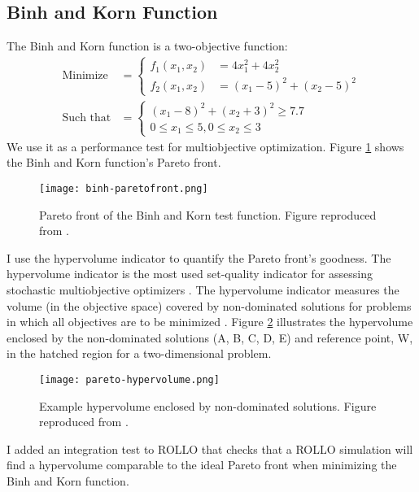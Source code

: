\subsection{Binh and Korn Function}
\label{sec:binhandkorn}
The Binh and Korn function \cite{binh_mobes_1997} is a two-objective function:
\begin{align}
    \mbox{Minimize} &= \begin{cases}
        f_1 (x_1,x_2) &= 4x_1^2+4x_2^2 \\
        f_2 (x_1,x_2) &= (x_1-5)^2 + (x_2-5)^2 
    \end{cases} \\
    \mbox{Such that} &= \begin{cases}
        (x_1-8)^2 + (x_2+3)^2 \geq 7.7 \nonumber \\
        0 \leq x_1 \leq 5, 0 \leq x_2 \leq 3 \nonumber
    \end{cases}
\end{align}
We use it as a performance test for multiobjective optimization.
Figure \ref{fig:binh_paretofront} shows the Binh and Korn function's Pareto front.
\begin{figure}[htbp]
    \centering
    \texttt{[image: binh-paretofront.png]} 
    \caption{Pareto front of the Binh and Korn test function. Figure reproduced from 
    \cite{bassi_statistics_2018}. }
    \label{fig:binh_paretofront}
\end{figure}
I use the hypervolume indicator to quantify the Pareto front's goodness. 
The hypervolume indicator is the most used set-quality indicator for assessing 
stochastic multiobjective optimizers \cite{guerreiro_hypervolume_2020}.
The hypervolume indicator measures the volume (in the objective space) covered by 
non-dominated solutions for problems in which all objectives are to be 
minimized \cite{deb_multi-objective_2001}. 
Figure \ref{fig:pareto_hypervolume} illustrates the hypervolume enclosed by the 
non-dominated solutions (A, B, C, D, E) and reference point, W, in the hatched region 
for a two-dimensional problem.
\begin{figure}[htbp]
    \centering
    \texttt{[image: pareto-hypervolume.png]} 
    \caption{Example hypervolume enclosed by non-dominated solutions. Figure reproduced 
    from \cite{deb_multi-objective_2001}.}
    \label{fig:pareto_hypervolume}
\end{figure}
I added an integration test to ROLLO that checks that a ROLLO simulation will 
find a hypervolume comparable to the ideal Pareto front when minimizing the
Binh and Korn function. 


